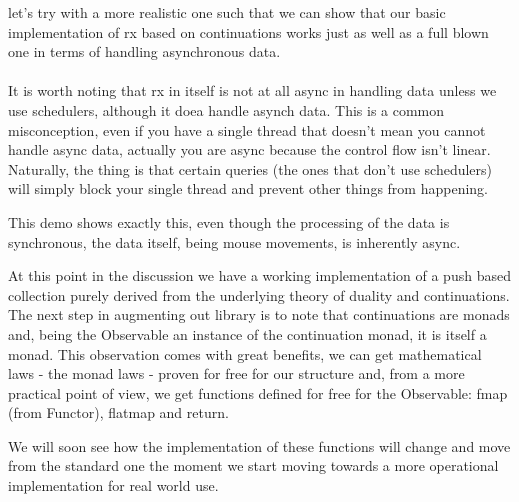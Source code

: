 let's try with a more realistic one such that we can show that our basic implementation of rx based on continuations works just as well as a full blown one in terms of handling asynchronous data.\\ 

\\

It is worth noting that rx in itself is not at all async in handling data unless we use schedulers, although it doea handle asynch data. This is a common misconception, even if you have a single thread that doesn't mean you cannot handle async data, actually you are async because the control flow isn't linear. Naturally, the thing is that certain queries (the ones that don't use schedulers) will simply block your single thread and prevent other things from happening.

This demo shows exactly this, even though the processing of the data is synchronous, the data itself, being mouse movements, is inherently async.

At this point in the discussion we have a working implementation of a push based collection purely derived from the underlying theory of duality and continuations. The next step in augmenting out library is to note that continuations are monads and, being the Observable an instance of the continuation monad, it is itself a monad. This observation comes with great benefits, we can get mathematical laws - the monad laws - proven for free for our structure and, from a more practical point of view, we get functions defined for free for the Observable: fmap (from Functor), flatmap and return.


We will soon see how the implementation of these functions will change and move from the standard one the moment we start moving towards a more operational implementation for real world use.